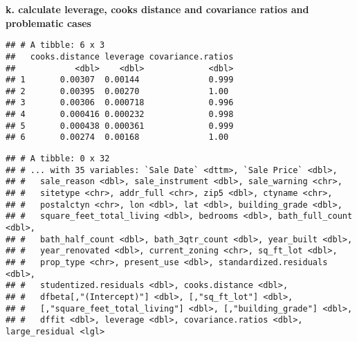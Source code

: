 \documentclass[
]{article}
\newenvironment{Shaded}{\begin{snugshade}}{\end{snugshade}}
\newcommand{\CommentTok}[1]{\textcolor[rgb]{0.56,0.35,0.01}{\textit{#1}}}
\newcommand{\DecValTok}[1]{\textcolor[rgb]{0.00,0.00,0.81}{#1}}
\newcommand{\KeywordTok}[1]{\textcolor[rgb]{0.13,0.29,0.53}{\textbf{#1}}}
\newcommand{\NormalTok}[1]{#1}
\newcommand{\OperatorTok}[1]{\textcolor[rgb]{0.81,0.36,0.00}{\textbf{#1}}}
\newcommand{\StringTok}[1]{\textcolor[rgb]{0.31,0.60,0.02}{#1}}
\begin{document}
\textbf{k. calculate leverage, cooks distance and covariance ratios and
problematic cases }

\begin{Shaded}
\end{Shaded}

\begin{verbatim}
## # A tibble: 6 x 3
##   cooks.distance leverage covariance.ratios
##            <dbl>    <dbl>             <dbl>
## 1       0.00307  0.00144              0.999
## 2       0.00395  0.00270              1.00 
## 3       0.00306  0.000718             0.996
## 4       0.000416 0.000232             0.998
## 5       0.000438 0.000361             0.999
## 6       0.00274  0.00168              1.00
\end{verbatim}

\begin{Shaded}
\end{Shaded}

\begin{verbatim}
## # A tibble: 0 x 32
## # ... with 35 variables: `Sale Date` <dttm>, `Sale Price` <dbl>,
## #   sale_reason <dbl>, sale_instrument <dbl>, sale_warning <chr>,
## #   sitetype <chr>, addr_full <chr>, zip5 <dbl>, ctyname <chr>,
## #   postalctyn <chr>, lon <dbl>, lat <dbl>, building_grade <dbl>,
## #   square_feet_total_living <dbl>, bedrooms <dbl>, bath_full_count <dbl>,
## #   bath_half_count <dbl>, bath_3qtr_count <dbl>, year_built <dbl>,
## #   year_renovated <dbl>, current_zoning <chr>, sq_ft_lot <dbl>,
## #   prop_type <chr>, present_use <dbl>, standardized.residuals <dbl>,
## #   studentized.residuals <dbl>, cooks.distance <dbl>,
## #   dfbeta[,"(Intercept)"] <dbl>, [,"sq_ft_lot"] <dbl>,
## #   [,"square_feet_total_living"] <dbl>, [,"building_grade"] <dbl>,
## #   dffit <dbl>, leverage <dbl>, covariance.ratios <dbl>, large_residual <lgl>
\end{verbatim}
\end{document}
